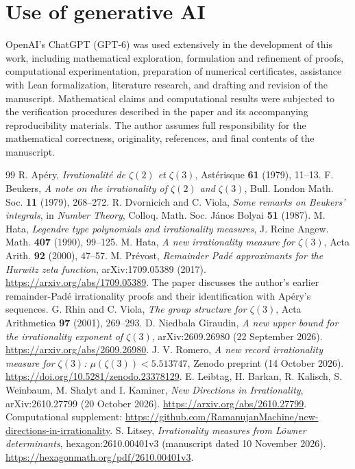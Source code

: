 \documentclass[11pt]{article}
\theoremstyle{definition}\newtheorem{definition}[theorem]{Definition}
\theoremstyle{remark}\newtheorem{remark}[theorem]{Remark}
\begin{document}
\section*{Use of generative AI}
OpenAI's ChatGPT (GPT-6) was used extensively in the development of this work, including mathematical exploration, formulation and refinement of proofs, computational experimentation, preparation of numerical certificates, assistance with Lean formalization, literature research, and drafting and revision of the manuscript. Mathematical claims and computational results were subjected to the verification procedures described in the paper and its accompanying reproducibility materials. The author assumes full responsibility for the mathematical correctness, originality, references, and final contents of the manuscript.

\begin{thebibliography}{99}
R. Ap\'ery, \emph{Irrationalit\'e de $\zeta(2)$ et $\zeta(3)$}, Ast\'erisque \textbf{61} (1979), 11--13.
F. Beukers, \emph{A note on the irrationality of $\zeta(2)$ and $\zeta(3)$}, Bull. London Math. Soc. \textbf{11} (1979), 268--272.
R. Dvornicich and C. Viola, \emph{Some remarks on Beukers' integrals}, in \emph{Number Theory}, Colloq. Math. Soc. J\'anos Bolyai \textbf{51} (1987).
M. Hata, \emph{Legendre type polynomials and irrationality measures}, J. Reine Angew. Math. \textbf{407} (1990), 99--125.
M. Hata, \emph{A new irrationality measure for $\zeta(3)$}, Acta Arith. \textbf{92} (2000), 47--57.
M. Pr\'evost, \emph{Remainder Pad\'e approximants for the Hurwitz zeta function}, arXiv:1709.05389 (2017).
\url{https://arxiv.org/abs/1709.05389}.
The paper discusses the author's earlier remainder-Pad\'e irrationality proofs and their identification with Ap\'ery's sequences.
G. Rhin and C. Viola, \emph{The group structure for $\zeta(3)$}, Acta Arithmetica \textbf{97} (2001), 269--293.
D. Niedbala Giraudin, \emph{A new upper bound for the irrationality exponent of $\zeta(3)$}, arXiv:2609.26980 (22 September 2026).
\url{https://arxiv.org/abs/2609.26980}.
J. V. Romero, \emph{A new record irrationality measure for $\zeta(3)$:
$\mu(\zeta(3))<5.513747$}, Zenodo preprint (14 October 2026).
\url{https://doi.org/10.5281/zenodo.23378129}.
E. Leibtag, H. Barkan, R. Kalisch, S. Weinbaum, M. Shalyt and I. Kaminer, \emph{New Directions in Irrationality}, arXiv:2610.27799 (20 October 2026).
\url{https://arxiv.org/abs/2610.27799}.
Computational supplement:
\url{https://github.com/RamanujanMachine/new-directions-in-irrationality}.
S. Litsey, \emph{Irrationality measures from L\"owner determinants}, hexagon:2610.00401v3 (manuscript dated 10 November 2026).
\url{https://hexagonmath.org/pdf/2610.00401v3}.
\end{thebibliography}
\end{document}
